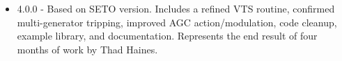 \begin{itemize}
 em
\item 4.0.0 - Based on SETO version. 
Includes a refined VTS routine, confirmed multi-generator tripping, improved AGC action/modulation, code cleanup, example library, and documentation.
Represents the end result of four months of work by Thad Haines.
\end{itemize}